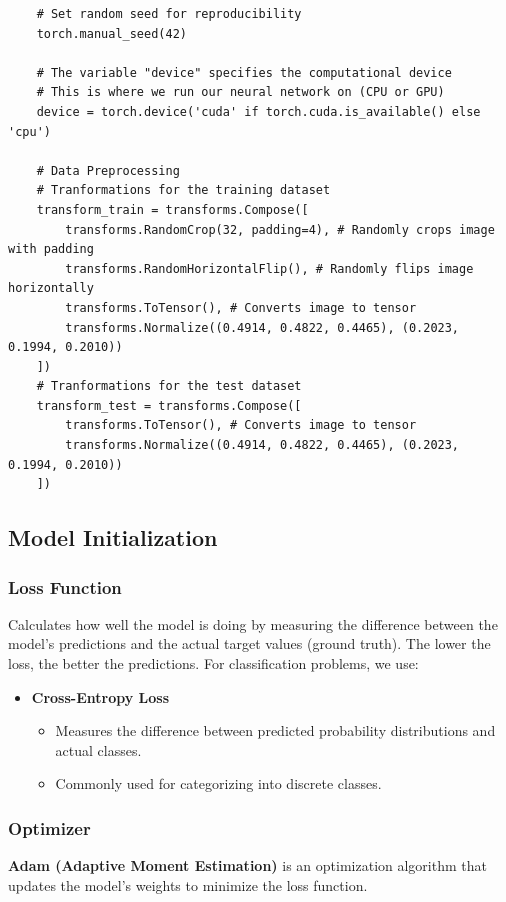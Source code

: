 \begin{lstlisting}
    # Set random seed for reproducibility
    torch.manual_seed(42)

    # The variable "device" specifies the computational device 
    # This is where we run our neural network on (CPU or GPU)
    device = torch.device('cuda' if torch.cuda.is_available() else 'cpu')

    # Data Preprocessing 
    # Tranformations for the training dataset
    transform_train = transforms.Compose([
        transforms.RandomCrop(32, padding=4), # Randomly crops image with padding
        transforms.RandomHorizontalFlip(), # Randomly flips image horizontally
        transforms.ToTensor(), # Converts image to tensor
        transforms.Normalize((0.4914, 0.4822, 0.4465), (0.2023, 0.1994, 0.2010))
    ])
    # Tranformations for the test dataset
    transform_test = transforms.Compose([
        transforms.ToTensor(), # Converts image to tensor
        transforms.Normalize((0.4914, 0.4822, 0.4465), (0.2023, 0.1994, 0.2010))
    ])
\end{lstlisting}


\subsection{Model Initialization}
\subsubsection{Loss Function}
Calculates how well the model is doing by measuring the difference between the model's predictions and the actual target values (ground truth). The lower the loss, the better the predictions. For classification problems, we use:
\begin{itemize}[noitemsep]
    \item \textbf{Cross-Entropy Loss}
    \begin{itemize}[noitemsep]
        \item Measures the difference between predicted probability distributions and actual classes.
        \item Commonly used for categorizing into discrete classes.
    \end{itemize}
\end{itemize}

\subsubsection{Optimizer}
\textbf{Adam (Adaptive Moment Estimation)} is an optimization algorithm that updates the model's 
weights to minimize the loss function.

